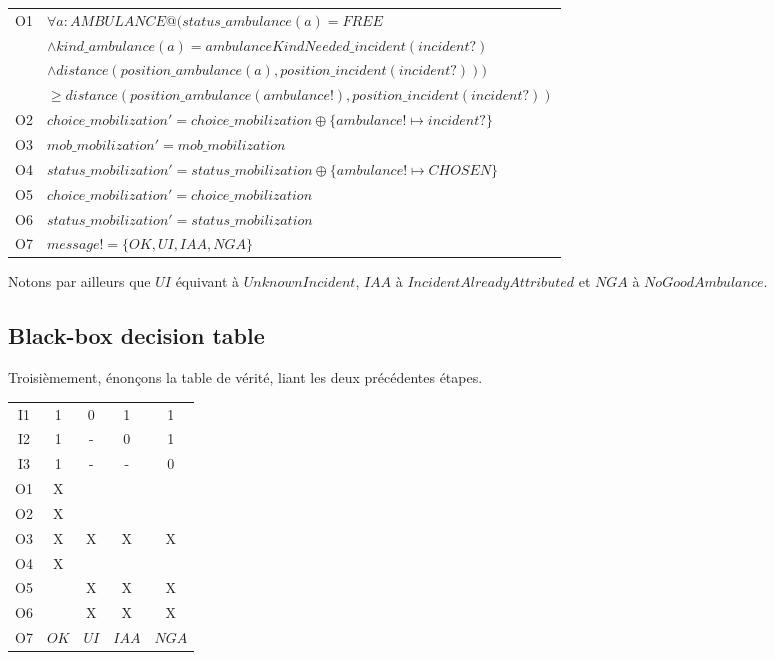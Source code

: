 \documentclass{report}
\begin{document}
\noindent\begin{minipage}{\marginparsep+\marginparwidth+\marginparpush+\textwidth}
\begin{tabularx}{\textwidth}{|l|X|}
	\hline
	O1 & $\forall a: AMBULANCE @ (status\_ambulance(a) = FREE$\\&$\land
  	 kind\_ambulance(a) = ambulanceKindNeeded\_incident(incident?)$\\&$\land
  	 distance(position\_ambulance(a), position\_incident(incident?)))$\\&$
  	 \geq distance(position\_ambulance(ambulance!), position\_incident(incident?))$ \\
  	\hline
  	O2 & $choice\_mobilization' = choice\_mobilization \oplus \{ ambulance! \mapsto incident? \}$ \\
  	\hline
  	O3 & $mob\_mobilization' = mob\_mobilization$ \\
  	\hline
  	O4 & $status\_mobilization' = status\_mobilization \oplus \{ ambulance! \mapsto CHOSEN \}$ \\
  	\hline
  	O5 & $choice\_mobilization' = choice\_mobilization$ \\
	\hline
	O6 & $status\_mobilization' = status\_mobilization$ \\
  	\hline
  	O7 & $message! = \{OK, UI, IAA, NGA\}$ \\
  	\hline
\end{tabularx}
\end{minipage}

Notons par ailleurs que $UI$ équivant à $UnknownIncident$, $IAA$ à $IncidentAlreadyAttributed$ et $NGA$ à $NoGoodAmbulance$.

\subsection{Black-box decision table}

Troisièmement, énonçons la table de vérité, liant les deux précédentes
étapes.

\begin{tabular}{|c|c|c|c|c|}
	\hline
	I1 & 1 & 0 & 1 & 1 \\
	I2 & 1 & - & 0 & 1 \\
	I3 & 1 & - & - & 0 \\
	\hline \hline
	O1 & X &   &   &   \\
	O2 & X &   &   &   \\
	O3 & X & X & X & X \\
	O4 & X &   &   &   \\
	O5 &   & X & X & X \\
	O6 &   & X & X & X \\
	O7 & $OK$ & $UI$ & $IAA$ & $NGA$ \\
	\hline
\end{tabular}
\end{document}

